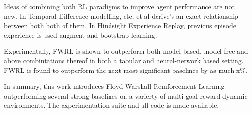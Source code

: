 Ideas of combining both RL paradigms to improve agent performance are
not new. In Temporal-Difference modelling, etc. et al derive's an exact
relationship between both both of them. In Hindsight Experience Replay,
previous episode experience is used augment and bootstrap learning. 

Experimentally, FWRL is shown to outperform both model-based, model-free
and above combintations thereof in both a tabular and neural-network
based setting. FWRL is found to outperform the next most significant
baselines by as much x\%.


In summary, this work introduces Floyd-Warshall Reinforcement Learning
outperforming several strong baselines on a varierty of multi-goal
reward-dynamic environments. The experimentation suite and all code is
made available.










